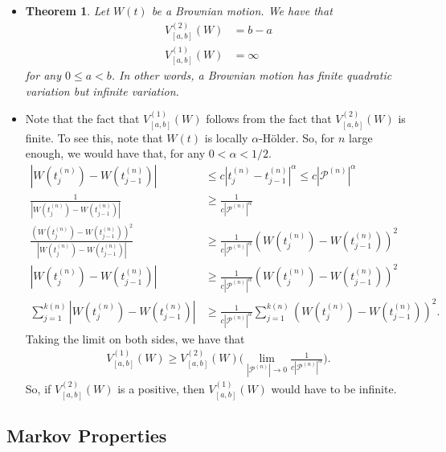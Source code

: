 \documentclass[10pt]{article}
\newtheorem{theorem}[lemma]{Theorem}
\newcommand{\mcal}[1]{\mathcal{#1}}
\begin{document}
\begin{itemize}
  \item \begin{theorem}
    Let $W(t)$ be a Brownian motion. We have that
    \begin{align*}
      V^{(2)}_{[a,b]}(W) &= b-a \\
      V^{(1)}_{[a,b]}(W) &= \infty
    \end{align*}
    for any $0 \leq a < b$. In other words, a Brownian motion has finite quadratic variation but infinite variation.
  \end{theorem}

  \item Note that the fact that $V^{(1)}_{[a,b]}(W)$ follows from the fact that $V^{(2)}_{[a,b]}(W)$ is finite. To see this, note that $W(t)$ is locally $\alpha$-H\"{o}lder. So, for $n$ large enough, we would have that, for any $0 < \alpha < 1/2$.
  \begin{align*}
    |W(t^{(n)}_j) - W(t^{(n)}_{j-1})| &\leq c| t^{(n)}_j - t^{(n)}_{j-1} |^\alpha \leq c| \mcal{P}^{(n)} |^\alpha \\
    \frac{1}{|W(t^{(n)}_j) - W(t^{(n)}_{j-1})|}  & \geq \frac{1}{c|\mcal{P}^{(n)}|^\alpha} \\
    \frac{(W(t^{(n)}_j) - W(t^{(n)}_{j-1}))^2}{|W(t^{(n)}_j) - W(t^{(n)}_{j-1})|}  & \geq \frac{1}{c|\mcal{P}^{(n)}|^\alpha} (W(t^{(n)}_j) - W(t^{(n)}_{j-1}))^2 \\
    |W(t^{(n)}_j) - W(t^{(n)}_{j-1})| &\geq \frac{1}{c|\mcal{P}^{(n)}|^\alpha} (W(t^{(n)}_j) - W(t^{(n)}_{j-1}))^2 \\
    \sum_{j=1}^{k(n)} |W(t^{(n)}_j) - W(t^{(n)}_{j-1})| &\geq \frac{1}{c|\mcal{P}^{(n)}|^\alpha} \sum_{j=1}^{k(n)} (W(t^{(n)}_j) - W(t^{(n)}_{j-1}))^2.
  \end{align*} 
  Taking the limit on both sides, we have that
  \begin{align*}
    V^{(1)}_{[a,b]}(W) \geq V^{(2)}_{[a,b]}(W) \bigg( \lim_{|\mcal{P}^{(n)}| \rightarrow 0} \frac{1}{c|\mcal{P}^{(n)}|^\alpha} \bigg).
  \end{align*}
  So, if $V^{(2)}_{[a,b]}(W)$ is a positive, then $V^{(1)}_{[a,b]}(W)$ would have to be infinite.
\end{itemize}

\subsection{Markov Properties}
\end{document}
